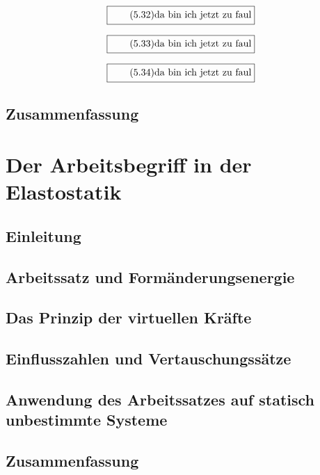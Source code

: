 \documentclass[11pt]{article}
\newcommand{\1}{ {\mathds{1}} }
\begin{document}
		\begin{equation}
			\boxed{
				\tag{5.32}
				\begin{split}
					\text{da bin ich jetzt zu faul}
				\end{split}
			}
		\end{equation}

		\begin{equation}
			\boxed{
				\tag{5.33}
				\begin{split}
					\text{da bin ich jetzt zu faul}
				\end{split}
			}
		\end{equation}

		\begin{equation}
			\boxed{
				\tag{5.34}
				\begin{split}
					\text{da bin ich jetzt zu faul}
				\end{split}
			}
		\end{equation}
		
		\subsection{Zusammenfassung}	

		\section{Der Arbeitsbegriff in der Elastostatik}
		\subsection{Einleitung}
		\subsection{Arbeitssatz und Formänderungsenergie}
		\subsection{Das Prinzip der virtuellen Kräfte}
		\subsection{Einflusszahlen und Vertauschungssätze}
		\subsection{Anwendung des Arbeitssatzes auf statisch unbestimmte Systeme}
		\subsection{Zusammenfassung}
\end{document}
